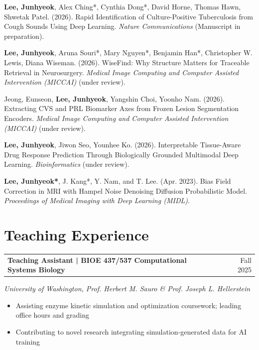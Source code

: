 \documentclass[a4paper,10pt]{article}
\makeatletter
\newenvironment{jobshort}[2]
    {
    \begin{tabularx}{\linewidth}{@{}l X r@{}}
    \textbf{#1} & \hfill &  #2 \\
    \end{tabularx}
    \vspace{-4pt}
    }
    {
    \vspace{3pt}
    }
\makeatother
\begin{document}
\textbf{Lee, Junhyeok}, Alex Ching*, Cynthia Dong*, David Horne, Thomas Hawn, Shwetak Patel. (2026). Rapid Identification of Culture-Positive Tuberculosis from Cough Sounds Using Deep Learning. \textit{Nature Communications} (Manuscript in preparation).

\textbf{Lee, Junhyeok}, Aruna Souri*, Mary Nguyen*, Benjamin Han*, Christopher W. Lewis, Diana Wiseman. (2026). WiseFind: Why Structure Matters for Traceable Retrieval in Neurosurgery. \textit{Medical Image Computing and Computer Assisted Intervention (MICCAI)} (under review).

Jeong, Eunseon, \textbf{Lee, Junhyeok}, Yangshin Choi, Yoonho Nam. (2026). Extracting CVS and PRL Biomarker Axes from Frozen Lesion Segmentation Encoders. \textit{Medical Image Computing and Computer Assisted Intervention (MICCAI)} (under review).

\textbf{Lee, Junhyeok}, Jiwon Seo, Younhee Ko. (2026). Interpretable Tissue-Aware Drug Response Prediction Through Biologically Grounded Multimodal Deep Learning. \textit{Bioinformatics} (under review).

\textbf{Lee, Junhyeok*}, J. Kang*, Y. Nam, and T. Lee. (Apr. 2023). Bias Field Correction in MRI with Hampel Noise Denoising Diffusion Probabilistic Model. \textit{Proceedings of Medical Imaging with Deep Learning (MIDL)}.


\section{Teaching Experience}

\begin{jobshort}{Teaching Assistant | BIOE 437/537 Computational Systems Biology}{Fall 2025}
\textit{University of Washington, Prof. Herbert M. Sauro \& Prof. Joseph L. Hellerstein}
\end{jobshort}
\begin{itemize}[nosep,after=\strut, leftmargin=1em, itemsep=2pt,label=--]
\item Assisting enzyme kinetic simulation and optimization coursework; leading office hours and grading
\item Contributing to novel research integrating simulation-generated data for AI training
\end{itemize}
\vspace{2.0pt}
\end{document}
